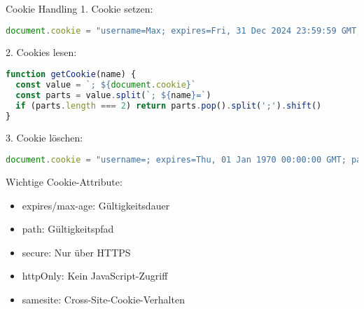 \begin{KR}{Cookie Handling}
1. Cookie setzen:
\begin{lstlisting}[language=JavaScript, style=basesmol]
document.cookie = "username=Max; expires=Fri, 31 Dec 2024 23:59:59 GMT; path=/"
\end{lstlisting}

2. Cookies lesen:
\begin{lstlisting}[language=JavaScript, style=basesmol]
function getCookie(name) {
  const value = `; ${document.cookie}`
  const parts = value.split(`; ${name}=`)
  if (parts.length === 2) return parts.pop().split(';').shift()
}
\end{lstlisting}

3. Cookie löschen:
\begin{lstlisting}[language=JavaScript, style=basesmol]
document.cookie = "username=; expires=Thu, 01 Jan 1970 00:00:00 GMT; path=/"
\end{lstlisting}

Wichtige Cookie-Attribute:
\begin{itemize}
  \item expires/max-age: Gültigkeitsdauer
  \item path: Gültigkeitspfad
  \item secure: Nur über HTTPS
  \item httpOnly: Kein JavaScript-Zugriff
  \item samesite: Cross-Site-Cookie-Verhalten
\end{itemize}
\end{KR}